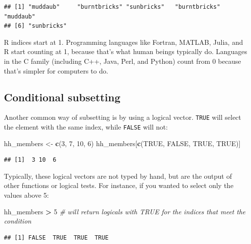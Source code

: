\documentclass[]{book}
\newenvironment{Shaded}{\begin{snugshade}}{\end{snugshade}}
\newcommand{\KeywordTok}[1]{\textcolor[rgb]{0.13,0.29,0.53}{\textbf{#1}}}
\newcommand{\DecValTok}[1]{\textcolor[rgb]{0.00,0.00,0.81}{#1}}
\newcommand{\StringTok}[1]{\textcolor[rgb]{0.31,0.60,0.02}{#1}}
\newcommand{\CommentTok}[1]{\textcolor[rgb]{0.56,0.35,0.01}{\textit{#1}}}
\newcommand{\OtherTok}[1]{\textcolor[rgb]{0.56,0.35,0.01}{#1}}
\newcommand{\OperatorTok}[1]{\textcolor[rgb]{0.81,0.36,0.00}{\textbf{#1}}}
\newcommand{\NormalTok}[1]{#1}
\begin{document}
\begin{verbatim}
## [1] "muddaub"     "burntbricks" "sunbricks"   "burntbricks" "muddaub"    
## [6] "sunbricks"
\end{verbatim}

R indices start at 1. Programming languages like Fortran, MATLAB, Julia,
and R start counting at 1, because that's what human beings typically
do. Languages in the C family (including C++, Java, Perl, and Python)
count from 0 because that's simpler for computers to do.

\subsection{Conditional subsetting}\label{conditional-subsetting}

Another common way of subsetting is by using a logical vector.
\texttt{TRUE} will select the element with the same index, while
\texttt{FALSE} will not:

\begin{Shaded}
\begin{Highlighting}[]
\NormalTok{hh_members <-}\StringTok{ }\KeywordTok{c}\NormalTok{(}\DecValTok{3}\NormalTok{, }\DecValTok{7}\NormalTok{, }\DecValTok{10}\NormalTok{, }\DecValTok{6}\NormalTok{)}
\NormalTok{hh_members[}\KeywordTok{c}\NormalTok{(}\OtherTok{TRUE}\NormalTok{, }\OtherTok{FALSE}\NormalTok{, }\OtherTok{TRUE}\NormalTok{, }\OtherTok{TRUE}\NormalTok{)]}
\end{Highlighting}
\end{Shaded}

\begin{verbatim}
## [1]  3 10  6
\end{verbatim}

Typically, these logical vectors are not typed by hand, but are the
output of other functions or logical tests. For instance, if you wanted
to select only the values above 5:

\begin{Shaded}
\begin{Highlighting}[]
\NormalTok{hh_members }\OperatorTok{>}\StringTok{ }\DecValTok{5}    \CommentTok{# will return logicals with TRUE for the indices that meet the condition}
\end{Highlighting}
\end{Shaded}

\begin{verbatim}
## [1] FALSE  TRUE  TRUE  TRUE
\end{verbatim}
\end{document}
